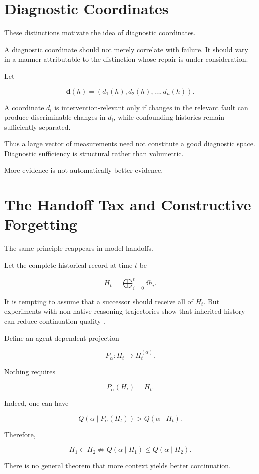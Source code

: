 \documentclass[11pt]{article}
\begin{document}
\section{Diagnostic Coordinates}

These distinctions motivate the idea of diagnostic coordinates.

A diagnostic coordinate should not merely correlate with failure. It should vary in a manner attributable to the distinction whose repair is under consideration.

Let

\[ \mathbf d(h)
=
(d_1(h),d_2(h),\ldots,d_n(h)). \]

A coordinate $d_i$ is intervention-relevant only if changes in the relevant fault can produce discriminable changes in $d_i$, while confounding histories remain sufficiently separated.

Thus a large vector of measurements need not constitute a good diagnostic space. Diagnostic sufficiency is structural rather than volumetric.

More evidence is not automatically better evidence.

\section{The Handoff Tax and Constructive Forgetting}

The same principle reappears in model handoffs.

Let the complete historical record at time $t$ be

\[ H_t=\bigoplus_{i=0}^{t}\delta h_i.\]

It is tempting to assume that a successor should receive all of $H_t$. But experiments with non-native reasoning trajectories show that inherited history can reduce continuation quality \cite{ganz2026handoff}.

Define an agent-dependent projection

\[ P_\alpha:H_t\rightarrow H_t^{(\alpha)}.\]

Nothing requires

\[ P_\alpha(H_t)=H_t.\]

Indeed, one can have

\[ Q(\alpha\mid P_\alpha(H_t))
>
Q(\alpha\mid H_t). \]

Therefore,

\[ H_1\subset H_2 \not\Rightarrow Q(\alpha\mid H_1) \le Q(\alpha\mid H_2).\]

There is no general theorem that more context yields better continuation.
\end{document}
